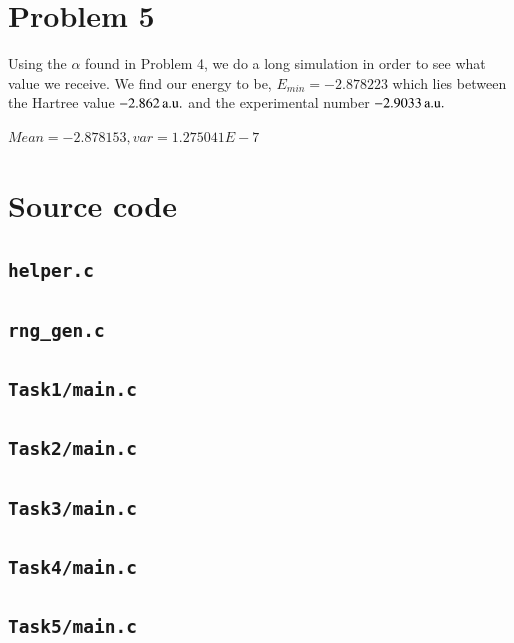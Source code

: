 \section*{Problem 5}

Using the $\alpha$ found in Problem 4, we do a long simulation in order to see what value we receive. We find our energy to be, $E_{min}=-2.878223$ which lies between the Hartree value $\unit[-2.862]{a.u.}$ and the experimental number $\unit[-2.9033]{a.u.}$

$Mean = -2.878153, var = 1.275041E-7$






\appendix
\section{Source code}
\subsection{\texttt{helper.c}}


\subsection{\texttt{rng\_gen.c}}


\subsection{\texttt{Task1/main.c}}


\subsection{\texttt{Task2/main.c}}


\subsection{\texttt{Task3/main.c}}


\subsection{\texttt{Task4/main.c}}


\subsection{\texttt{Task5/main.c}}




